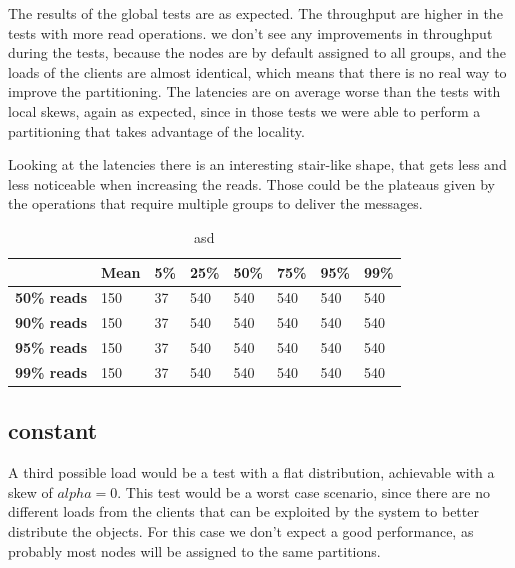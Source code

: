The results of the global tests are as expected. The throughput are higher in the tests with more read operations. we don't see any improvements in throughput during the tests, because the nodes are by default assigned to all groups, and the loads of the clients are almost identical, which means that there is no real way to improve the partitioning. The latencies are on average worse than the tests with local skews, again as expected, since in those tests we were able to perform a partitioning that takes advantage of the locality.

Looking at the latencies there is an interesting stair-like shape, that gets less and less noticeable when increasing the reads. Those could be the plateaus given by the operations that require multiple groups to deliver the messages.



\begin{table}[!htb]
  \centering
  \begin{tabular}{l l l l l l l l}
    \hline
    & \textbf{Mean} & \textbf{5\%} & \textbf{25\%} & \textbf{50\%} & \textbf{75\%} & \textbf{95\%}& \textbf{99\%} \\
    \hline
    \textbf{50\% reads} & 150 & 37 & 540 & 540 & 540 & 540 & 540 \\
    \textbf{90\% reads} & 150 & 37 & 540 & 540 & 540 & 540 & 540 \\
    \textbf{95\% reads} & 150 & 37 & 540 & 540 & 540 & 540 & 540 \\
    \textbf{99\% reads} & 150 & 37 & 540 & 540 & 540 & 540 & 540 \\
    \hline
  \end{tabular}
  \caption{asd}\label{tab:local-latencies-table}
\end{table}

\subsection{constant}\label{sec:constant}
A third possible load would be a test with a flat distribution, achievable with a skew of $alpha = 0$. This test would be a worst case scenario, since there are no different loads from the clients that can be exploited by the system to better distribute the objects. For this case we don't expect a good performance, as probably most nodes will be assigned to the same partitions.


